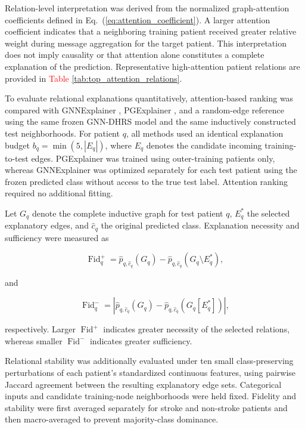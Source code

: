 \documentclass[pdflatex,sn-mathphys-num]{sn-jnl}%
\theoremstyle{thmstyleone}%
\theoremstyle{thmstyletwo}%
\theoremstyle{thmstylethree}%
\begin{document}
Relation-level interpretation was derived from the normalized graph-attention
coefficients defined in Eq.~(\ref{eq:attention_coefficient}).
 {
A larger attention coefficient indicates that a neighboring training patient
received greater relative weight during message aggregation for the target
patient. This interpretation does not imply causality or that attention alone
constitutes a complete explanation of the prediction. Representative
high-attention patient relations are provided in  \textcolor{red}{Table \ref{tab:top_attention_relations}}.
}

 {
To evaluate relational explanations quantitatively, attention-based ranking
was compared with GNNExplainer \cite{ying2019gnnexplainer}, PGExplainer
\cite{luo2020pgexplainer}, and a random-edge reference using the same frozen
GNN-DHRS model and the same inductively constructed test neighborhoods.
For patient \(q\), all methods used an identical explanation budget
\(b_q=\min(5,|E_q|)\), where \(E_q\) denotes the candidate incoming
training-to-test edges. PGExplainer was trained using outer-training patients
only, whereas GNNExplainer was optimized separately for each test patient
using the frozen predicted class without access to the true test label.
Attention ranking required no additional fitting.
}

Let \(G_q\) denote the complete inductive graph for test patient \(q\),
\(E_q^{*}\) the selected explanatory edges, and \(\widehat{c}_q\) the
original predicted class. Explanation necessity and sufficiency were measured
as

\begin{equation}
\operatorname{Fid}^{+}_{q}
=
\widehat{p}_{q,\widehat{c}_q}(G_q)
-
\widehat{p}_{q,\widehat{c}_q}
\left(G_q\setminus E_q^{*}\right),
\label{eq:explanation_fidelity_positive}
\end{equation}

and

\begin{equation}
\operatorname{Fid}^{-}_{q}
=
\left|
\widehat{p}_{q,\widehat{c}_q}(G_q)
-
\widehat{p}_{q,\widehat{c}_q}
\left(G_q[E_q^{*}]\right)
\right|,
\label{eq:explanation_fidelity_negative}
\end{equation}

respectively. Larger \(\operatorname{Fid}^{+}\) indicates greater
necessity of the selected relations, whereas smaller
\(\operatorname{Fid}^{-}\) indicates greater sufficiency.

 {
Relational stability was additionally evaluated under ten small
class-preserving perturbations of each patient's standardized continuous
features, using pairwise Jaccard agreement between the resulting explanatory
edge sets. Categorical inputs and candidate training-node neighborhoods were
held fixed. Fidelity and stability were first averaged separately for stroke
and non-stroke patients and then macro-averaged to prevent majority-class
dominance.
}
\end{document}
